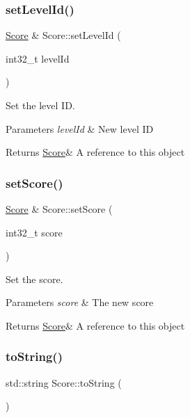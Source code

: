 \subsubsection{\texorpdfstring{set\+Level\+Id()}{setLevelId()}}
{\footnotesize\ttfamily \hyperlink{class_score}{Score} \& Score\+::set\+Level\+Id (\begin{DoxyParamCaption}\item[{int32\+\_\+t}]{level\+Id }\end{DoxyParamCaption})}



Set the level ID. 


\begin{DoxyParams}{Parameters}
{\em level\+Id} & New level ID \\
\hline
\end{DoxyParams}
\begin{DoxyReturn}{Returns}
\hyperlink{class_score}{Score}\& A reference to \textquotesingle{}this\textquotesingle{} object 
\end{DoxyReturn}
\mbox{\label{class_score_a8dc456d08a9c2b08935ca58f4cf8ba0f}} 
\subsubsection{\texorpdfstring{set\+Score()}{setScore()}}
{\footnotesize\ttfamily \hyperlink{class_score}{Score} \& Score\+::set\+Score (\begin{DoxyParamCaption}\item[{int32\+\_\+t}]{score }\end{DoxyParamCaption})}



Set the score. 


\begin{DoxyParams}{Parameters}
{\em score} & The new score \\
\hline
\end{DoxyParams}
\begin{DoxyReturn}{Returns}
\hyperlink{class_score}{Score}\& A reference to \textquotesingle{}this\textquotesingle{} object 
\end{DoxyReturn}
\mbox{\label{class_score_a543e8e801da09051ed563c11ab80ae12}} 
\subsubsection{\texorpdfstring{to\+String()}{toString()}}
{\footnotesize\ttfamily std\+::string Score\+::to\+String (\begin{DoxyParamCaption}{ }\end{DoxyParamCaption})}



